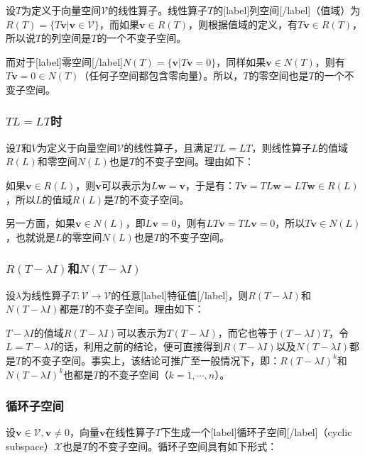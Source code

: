 \documentclass[UTF8,nofonts]{ctexart}
\begin{document}
设$T$为定义于向量空间$\mathcal{V}$的线性算子。线性算子$T$的[label]列空间[/label]（值域）为$R(T)=\{T\boldsymbol{v}|\boldsymbol{v}\in\mathcal{V}\}$，而如果$\boldsymbol{v}\in R(T)$，则根据值域的定义，有$T\boldsymbol{v}\in R(T)$，所以说$T$的列空间是$T$的一个不变子空间。

而对于[label]零空间[/label]$N(T)=\{\boldsymbol{v}|T\boldsymbol{v}=0\}$，同样如果$\boldsymbol{v}\in N(T)$，则有$T\boldsymbol{v}=0\in N(T)$（任何子空间都包含零向量）。所以，$T$的零空间也是$T$的一个不变子空间。

\subsubsection*{$TL=LT$时}

设$T$和$V$为定义于向量空间$\mathcal{V}$的线性算子，且满足$TL=LT$，则线性算子$L$的值域$R(L)$和零空间$N(L)$也是$T$的不变子空间。理由如下：

如果$\boldsymbol{v}\in R(L)$，则$\boldsymbol{v}$可以表示为$L\boldsymbol{w}=\boldsymbol{v}$，于是有：$T\boldsymbol{v}=TL\boldsymbol{w}=LT\boldsymbol{w}\in R(L)$，所以$L$的值域$R(L)$是$T$的不变子空间。

另一方面，如果$\boldsymbol{v}\in N(L)$，即$L\boldsymbol{v}=0$，则有$LT\boldsymbol{v}=TL\boldsymbol{v}=0$，所以$T\boldsymbol{v}\in N(L)$，也就说是$L$的零空间$N(L)$也是$T$的不变子空间。

\subsubsection*{$R(T-\lambda I)$和$N(T-\lambda I)$}

设$\lambda$为线性算子$T:\mathcal{V}\to\mathcal{V}$的任意[label]特征值[/label]，则$R(T-\lambda I)$和$N(T-\lambda I)$都是$T$的不变子空间。理由如下：

$T-\lambda I$的值域$R(T-\lambda I)$可以表示为$T(T-\lambda I)$，而它也等于$(T-\lambda I)T$，令$L=T-\lambda I$的话，利用之前的结论，便可直接得到$R(T-\lambda I)$以及$N(T-\lambda I)$都是$T$的不变子空间。事实上，该结论可推广至一般情况下，即：$R(T-\lambda I)^k$和$N(T-\lambda I)^k$也都是$T$的不变子空间（$k=1,\cdots,n$）。

\subsubsection*{循环子空间}

设$\boldsymbol{v}\in\mathcal{V},\boldsymbol{v} \neq 0$，向量$\boldsymbol{v}$在线性算子$T$下生成一个[label]循环子空间[/label]（cyclic subspace）$\mathcal{X}$也是$T$的不变子空间。循环子空间具有如下形式：
\end{document}
